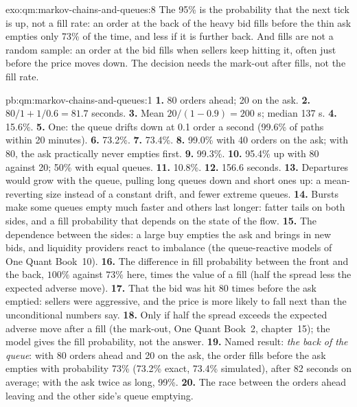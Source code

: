 \begin{solution}{exo:qm:markov-chains-and-queues:8}
The 95\% is the probability that the next tick is up, not a fill rate: an order at the back of the heavy bid fills
before the thin ask empties only 73\% of the time, and less if it is further back. And fills are not a random
sample: an order at the bid fills when sellers keep hitting it, often just before the price moves down. The
decision needs the mark-out after fills, not the fill rate.
\end{solution}

\begin{solution}{pb:qm:markov-chains-and-queues:1}
\textbf{1.} 80 orders ahead; 20 on the ask.
\textbf{2.} $80/1 + 1/0.6 = 81.7$ seconds.
\textbf{3.} Mean $20/(1 - 0.9) = 200$ s; median 137 s.
\textbf{4.} 15.6\%.
\textbf{5.} One: the queue drifts down at 0.1 order a second (99.6\% of paths within 20 minutes).
\textbf{6.} 73.2\%.
\textbf{7.} 73.4\%.
\textbf{8.} 99.0\% with 40 orders on the ask; with 80, the ask practically never empties first.
\textbf{9.} 99.3\%.
\textbf{10.} 95.4\% up with 80 against 20; 50\% with equal queues.
\textbf{11.} 10.8\%.
\textbf{12.} 156.6 seconds.
\textbf{13.} Departures would grow with the queue, pulling long queues down and short ones up: a mean-reverting size
instead of a constant drift, and fewer extreme queues.
\textbf{14.} Bursts make some queues empty much faster and others last longer: fatter tails on both sides, and a fill
probability that depends on the state of the flow.
\textbf{15.} The dependence between the sides: a large buy empties the ask and brings in new bids, and liquidity
providers react to imbalance (the queue-reactive models of One Quant Book~10).
\textbf{16.} The difference in fill probability between the front and the back, $100\%$ against $73\%$ here, times the
value of a fill (half the spread less the expected adverse move).
\textbf{17.} That the bid was hit 80 times before the ask emptied: sellers were aggressive, and the price is more likely
to fall next than the unconditional numbers say.
\textbf{18.} Only if half the spread exceeds the expected adverse move after a fill (the mark-out, One Quant Book~2,
chapter~15); the model gives the fill probability, not the answer.
\textbf{19.} Named result: \emph{the back of the queue}: with 80 orders ahead and 20 on the ask, the order fills before
the ask empties with probability 73\% (73.2\% exact, 73.4\% simulated), after 82 seconds on average; with the ask
twice as long, 99\%.
\textbf{20.} The race between the orders ahead leaving and the other side's queue emptying.
\end{solution}

